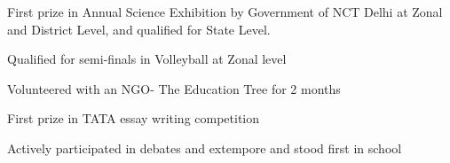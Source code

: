 \documentclass[]{deedy-resume-openfont}
\begin{document}
\begin{minipage}[t]{0.66\textwidth}
\begin{tightemize}
\item First prize in Annual Science Exhibition by Government of NCT Delhi at Zonal and District Level, and qualified for State Level.
\item Qualified for semi-finals in Volleyball at Zonal level
\item Volunteered with an NGO- The Education Tree for 2 months
\item First prize in TATA essay writing competition
\item Actively participated in debates and extempore and stood first in school
\end{tightemize}

\end{minipage} 
\end{document}
